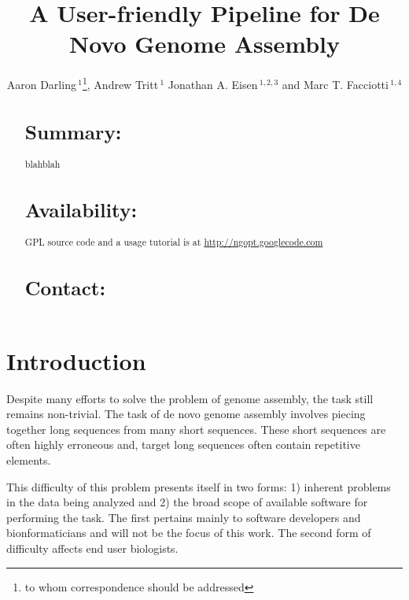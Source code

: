 \documentclass{bioinfo}
\begin{document}

\title[a5]{A User-friendly Pipeline for De Novo Genome Assembly}
\author[ChangeMe \textit{et~al}]{Aaron Darling\,$^{1}$\footnote{to whom correspondence should be addressed}, Andrew Tritt\,$^{1}$ Jonathan A. Eisen\,$^{1,2,3}$ and Marc T. Facciotti\,$^{1,4}$}
\address{$^{1}$Genome Center, $^{2}$ Dept. of Evolution and Ecology, $^{3}$ Medical Microbiology and Immunology, 
$^{4}$ Biomedical Engineering, University of California-Davis, Davis, CA 95616.}



\maketitle

\begin{abstract}

\section{Summary:}
blahblah
\section{Availability:}
GPL source code and a usage tutorial is at \href{http://ngopt.googlecode.com}{http://ngopt.googlecode.com}

\section{Contact:} \href{rabid apes}{}
\end{abstract}

\section{Introduction}
Despite many efforts to solve the problem of genome assembly, the task still remains non-trivial. 
The task of de novo genome assembly involves piecing together long sequences from many short sequences.
These short sequences are often highly erroneous and, target long sequences often contain repetitive 
elements. 

This difficulty of this problem presents itself in two forms: 1) inherent problems in the data being 
analyzed and 2) the broad scope of available software for performing the task. The first pertains
mainly to software developers and bionformaticians and will not be the focus of this work. The 
second form of difficulty affects end user biologists.  
\end{document}
